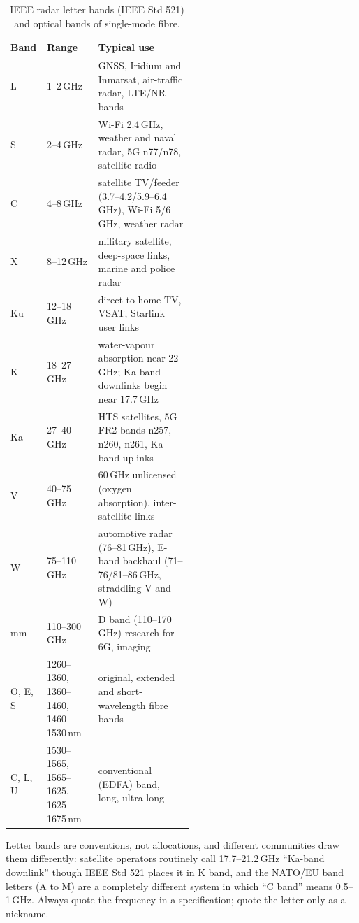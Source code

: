 \begin{table}[htbp]\centering\small
\caption{IEEE radar letter bands (IEEE Std 521) and optical bands of single-mode fibre.}\label{tab:appA:ieeebands}
\begin{tabular}{@{}llp{0.52\linewidth}@{}}
\toprule
Band & Range & Typical use\\
\midrule
L & 1--2\,GHz & GNSS, Iridium and Inmarsat, air-traffic radar, LTE/NR bands\\
S & 2--4\,GHz & Wi-Fi 2.4\,GHz, weather and naval radar, 5G n77/n78, satellite radio\\
C & 4--8\,GHz & satellite TV/feeder (3.7--4.2/5.9--6.4\,GHz), Wi-Fi 5/6\,GHz, weather radar\\
X & 8--12\,GHz & military satellite, deep-space links, marine and police radar\\
Ku & 12--18\,GHz & direct-to-home TV, VSAT, Starlink user links\\
K & 18--27\,GHz & water-vapour absorption near 22\,GHz; Ka-band downlinks begin near 17.7\,GHz\\
Ka & 27--40\,GHz & HTS satellites, 5G FR2 bands n257, n260, n261, Ka-band uplinks\\
V & 40--75\,GHz & 60\,GHz unlicensed (oxygen absorption), inter-satellite links\\
W & 75--110\,GHz & automotive radar (76--81\,GHz), E-band backhaul (71--76/81--86\,GHz, straddling V and W)\\
mm & 110--300\,GHz & D band (110--170\,GHz) research for 6G, imaging\\
\midrule
O, E, S & 1260--1360, 1360--1460, 1460--1530\,nm & original, extended and short-wavelength fibre bands\\
C, L, U & 1530--1565, 1565--1625, 1625--1675\,nm & conventional (EDFA) band, long, ultra-long\\
\bottomrule
\end{tabular}
\end{table}

\begin{pitfall}
Letter bands are conventions, not allocations, and different communities draw them differently:
satellite operators routinely call 17.7--21.2\,GHz ``Ka-band downlink'' though IEEE Std 521 places
it in K band, and the NATO/EU band letters (A to M) are a completely different system in which
``C band'' means 0.5--1\,GHz. Always quote the frequency in a specification; quote the letter only
as a nickname.
\end{pitfall}

